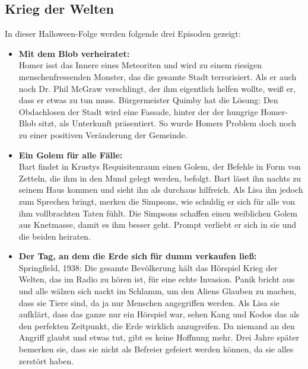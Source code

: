 \subsection{Krieg der Welten}
In dieser Halloween-Folge werden folgende drei Episoden gezeigt:
\begin{itemize}
	\item \textbf{Mit dem Blob verheiratet:}\\
	Homer isst das Innere eines Meteoriten und wird zu einem riesigen menschenfressenden Monster, das die gesamte Stadt terrorisiert. Als er auch noch Dr. Phil McGraw verschlingt, der ihm eigentlich helfen wollte, weiß er, dass er etwas zu tun muss. Bürgermeister Quimby hat die Lösung: Den Obdachlosen der Stadt wird eine Fassade, hinter der der hungrige Homer-Blob sitzt, als Unterkunft präsentiert. So wurde Homers Problem doch noch zu einer positiven Veränderung der Gemeinde.
	\item \textbf{Ein Golem für alle Fälle:}\\
	Bart findet in Krustys Requisitenraum einen Golem, der Befehle in Form von Zetteln, die ihm in den Mund gelegt werden, befolgt. Bart lässt ihn nachts zu seinem Haus kommen und sieht ihn als durchaus hilfreich. Als Lisa ihn jedoch zum Sprechen bringt, merken die Simpsons, wie schuldig er sich für alle von ihm vollbrachten Taten fühlt. Die Simpsons schaffen einen weiblichen Golem aus Knetmasse, damit es ihm besser geht. Prompt verliebt er sich in sie und die beiden heiraten.
	\item \textbf{Der Tag, an dem die Erde sich für dumm verkaufen ließ:}\\
	Springfield, 1938: Die gesamte Bevölkerung hält das Hörspiel \glqq Krieg der Welten\grqq , das im Radio zu hören ist, für eine echte Invasion. Panik bricht aus und alle wälzen sich nackt im Schlamm, um den Aliens Glauben zu machen, dass sie Tiere sind, da ja nur Menschen angegriffen werden. Als Lisa sie aufklärt, dass das ganze nur ein Hörspiel war, sehen Kang und Kodos das als den perfekten Zeitpunkt, die Erde wirklich anzugreifen. Da niemand an den Angriff glaubt und etwas tut, gibt es keine Hoffnung mehr. Drei Jahre später bemerken sie, dass sie nicht als Befreier gefeiert werden können, da sie alles zerstört haben. 
\end{itemize}

